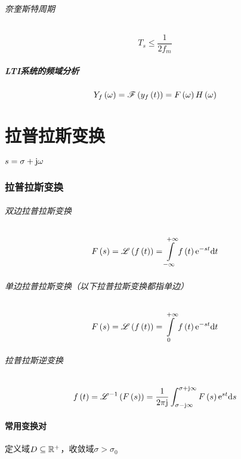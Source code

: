 \documentclass{article}
\begin{document}
\paragraph{奈奎斯特周期}

\[T_s\leqslant\frac1{2f_m}\]

\subsubsection{LTI系统的频域分析}

\[Y_f\left(\omega\right)=\mathscr F\left(y_f\left(t\right)\right)=F\left(\omega\right) H\left(\omega\right)\]

\part{拉普拉斯变换}

$s=\sigma+\mathrm j\omega$

\section{拉普拉斯变换}

\paragraph{双边拉普拉斯变换}

\[\fs=\laplace{\ft}=\impint\ft\e^{-st}\d t\]

\paragraph{单边拉普拉斯变换（以下拉普拉斯变换都指单边）}

\[F\left(s\right)=\mathscr L\left(f\left(t\right)\right)=\int\limits_0^{+\infty}f\left(t\right)\mathrm e^{-st}\mathrm d t\]

\paragraph{拉普拉斯逆变换}

\[f\left(t\right)=\mathscr L^{-1}\left(F\left(s\right)\right)=\frac1{2\pi\mathrm j}\int_{\sigma-\mathrm j\infty}^{\sigma+\mathrm j\infty}F\left(s\right)\mathrm e^{st}\mathrm d s\]

\subsection{常用变换对}

定义域$D\subseteq\mathbb R^+$，收敛域$\sigma>\sigma_0$
\end{document}
